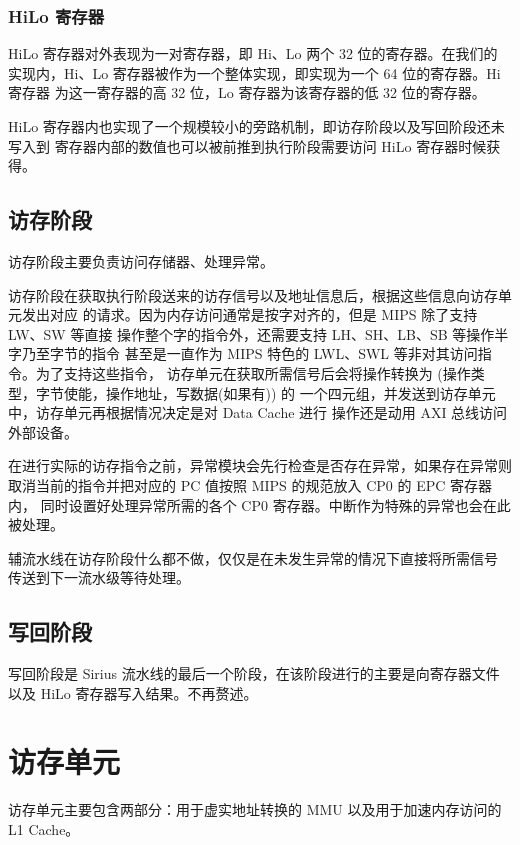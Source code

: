 \documentclass[blue,normal,cn,hide]{elegantbook}
\begin{document}
\subsection{HiLo 寄存器}

HiLo 寄存器对外表现为一对寄存器，即 Hi、Lo 两个 32 位的寄存器。在我们的
实现内，Hi、Lo 寄存器被作为一个整体实现，即实现为一个 64 位的寄存器。Hi 寄存器
为这一寄存器的高 32 位，Lo 寄存器为该寄存器的低 32 位的寄存器。

HiLo 寄存器内也实现了一个规模较小的旁路机制，即访存阶段以及写回阶段还未写入到
寄存器内部的数值也可以被前推到执行阶段需要访问 HiLo 寄存器时候获得。

\section{访存阶段}

访存阶段主要负责访问存储器、处理异常。

访存阶段在获取执行阶段送来的访存信号以及地址信息后，根据这些信息向访存单元发出对应
的请求。因为内存访问通常是按字对齐的，但是 MIPS 除了支持 LW、SW 等直接
操作整个字的指令外，还需要支持 LH、SH、LB、SB 等操作半字乃至字节的指令
甚至是一直作为 MIPS 特色的 LWL、SWL 等非对其访问指令。为了支持这些指令，
访存单元在获取所需信号后会将操作转换为 (操作类型，字节使能，操作地址，写数据(如果有)) 的
一个四元组，并发送到访存单元中，访存单元再根据情况决定是对 Data Cache 进行
操作还是动用 AXI 总线访问外部设备。

在进行实际的访存指令之前，异常模块会先行检查是否存在异常，如果存在异常则
取消当前的指令并把对应的 PC 值按照 MIPS 的规范放入 CP0 的 EPC 寄存器内，
同时设置好处理异常所需的各个 CP0 寄存器。中断作为特殊的异常也会在此被处理。

辅流水线在访存阶段什么都不做，仅仅是在未发生异常的情况下直接将所需信号
传送到下一流水级等待处理。

\section{写回阶段}

写回阶段是 Sirius 流水线的最后一个阶段，在该阶段进行的主要是向寄存器文件
以及 HiLo 寄存器写入结果。不再赘述。

\chapter{访存单元}

访存单元主要包含两部分：用于虚实地址转换的 MMU 以及用于加速内存访问的 L1 Cache。
\end{document}
